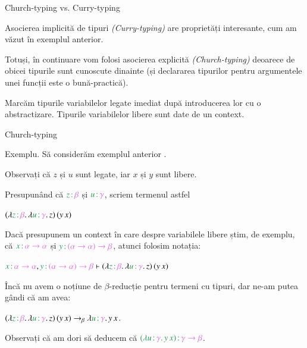 \documentclass[xcolor=pdftex,romanian,colorlinks]{beamer}
\begin{document}
\begin{frame}{Church-typing vs. Curry-typing}

Asocierea implicită de tipuri \textit{(Curry-typing)} are proprietăți interesante, cum am văzut în exemplul anterior.

\medskip
Totuși, în continuare vom folosi asocierea explicită \textit{(Church-typing)} deoarece de obicei tipurile sunt cunoscute dinainte (și declararea tipurilor pentru argumentele unei funcții este o bună-practică).

\medskip
Marcăm tipurile \alert{variabilelor legate} imediat după introducerea lor cu o abstractizare.
Tipurile \alert{variabilelor libere} sunt date de un \alert{context}.


\end{frame}

\begin{frame}{Church-typing}


{\color{True}Exemplu.} Să considerăm exemplul anterior .

Observați că $z$ și $u$ sunt legate, iar $x$ și $y$ sunt libere. 

Presupunând că $\type{z}{\beta}$ și $\type{u}{\gamma}$, scriem termenul astfel
\vspace{-.3cm}
\begin{center}
$\app{(\abs{\type{z}{\beta}}{\abs{\type{u}{\gamma}}{z}})}{(\app{y}{x})}$
\end{center}
\vspace{-.3cm}

\pause
Dacă presupunem un context în care despre variabilele libere știm, de exemplu, că $\type{x}{\alpha \to \alpha}$ și $\type{y}{(\alpha \to \alpha) \to \beta}$, atunci folosim notația:
\vspace{-.3cm}
\begin{center}
$\type{x}{\alpha \to \alpha}, \type{y}{(\alpha \to \alpha) \to \beta} \vdash \app{(\abs{\type{z}{\beta}}{\abs{\type{u}{\gamma}}{z}})}{(\app{y}{x})}$
\end{center}
\vspace{-.3cm}

\pause
Încă nu avem o noțiune de $\beta$-reducție pentru termeni cu tipuri, dar ne-am putea gândi că am avea:
\vspace{-.3cm}
\begin{center}
$\app{(\abs{\type{z}{\beta}}{\abs{\type{u}{\gamma}}{z}})}{(\app{y}{x})} \to_\beta \abs{\type{u}{\gamma}}{\app{y}{x}}$.
\end{center}
\vspace{-.3cm}

Observați că am dori să deducem că $\type{(\abs{\type{u}{\gamma}}{\app{y}{x}})}{\gamma \to \beta}$.

\end{frame}
\end{document}
